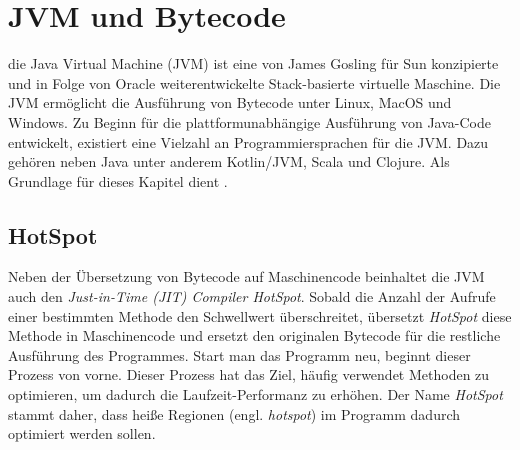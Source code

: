 \chapter{JVM und Bytecode}
\label{cha:jvm}

die Java Virtual Machine (JVM) ist eine von James Gosling für Sun konzipierte und in Folge von Oracle weiterentwickelte Stack-basierte virtuelle Maschine. Die JVM ermöglicht die Ausführung von Bytecode unter Linux, MacOS und Windows. Zu Beginn für die plattformunabhängige Ausführung von Java-Code entwickelt, existiert eine Vielzahl an Programmiersprachen für die JVM. Dazu gehören neben Java unter anderem Kotlin/JVM, Scala und Clojure.
Als Grundlage für dieses Kapitel dient \textcite{lindholm2016java}.

\section{HotSpot}

Neben der Übersetzung von Bytecode auf Maschinencode beinhaltet die JVM auch den \textit{Just-in-Time (JIT) Compiler HotSpot}. Sobald die Anzahl der Aufrufe einer bestimmten Methode den Schwellwert überschreitet, übersetzt \textit{HotSpot} diese Methode in Maschinencode und ersetzt den originalen Bytecode für die restliche Ausführung des Programmes. Start man das Programm neu, beginnt dieser Prozess von vorne. Dieser Prozess hat das Ziel, häufig verwendet Methoden zu optimieren, um dadurch die Laufzeit-Performanz zu erhöhen. Der Name \textit{HotSpot} stammt daher, dass heiße Regionen (engl. \textit{hotspot}) im Programm dadurch optimiert werden sollen.


